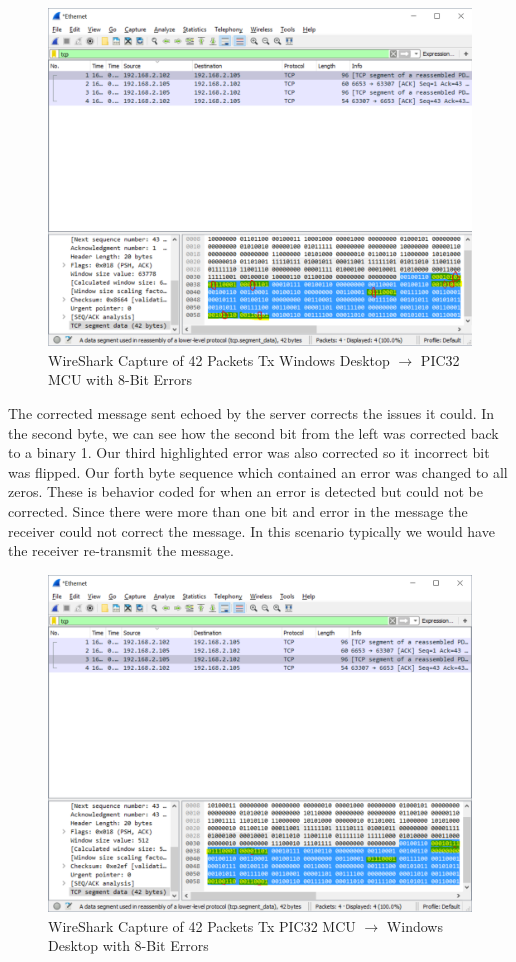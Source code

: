 \documentclass[12pt]{article}
\begin{document}
\begin{figure}[H]
    \centering
    \includegraphics[width=5.5in]{images/wireshark_vbtx_multibit_packets.PNG}
    \caption{WireShark Capture of 42 Packets Tx 
        Windows Desktop $\rightarrow$ PIC32 MCU with 8-Bit Errors}
    \label{fig:vb8error}
\end{figure}

The corrected message sent echoed by the server corrects the issues it could. 
In the second byte, we can see how the second bit from the left was corrected
back to a binary 1. Our third highlighted error was also corrected so it
incorrect bit was flipped. Our forth byte sequence which contained an error
was changed to all zeros. These is behavior coded for when an error is
detected but could not be corrected. Since there were more than one bit and
error in the message the receiver could  not correct the message. In this
scenario typically we would have the receiver re-transmit the message. 

\begin{figure}[H]
    \centering
    \includegraphics[width=5.5in]{images/wireshark_pictx_multibit_packets.PNG}
    \caption{WireShark Capture of 42 Packets Tx 
        PIC32 MCU $\rightarrow$ Windows Desktop with 8-Bit Errors}
    \label{fig:pic8error}
\end{figure}
\end{document}
